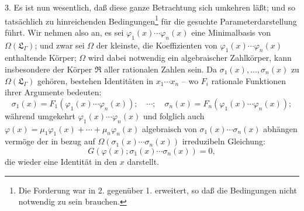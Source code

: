 \documentclass[11pt]{article}
\begin{document}
3. Es ist nun wesentlich, daß diese ganze Betrachtung sich umkehren läßt; und so tatsächlich zu hinreichenden Bedingungen\footnote{Die Forderung war in 2. gegenüber 1. erweitert, so daß die Bedingungen nicht notwendig zu sein brauchen.} für die gesuchte Parameterdarstellung führt. Wir nehmen also an, es sei $\varphi_1(x)\cdots\varphi_n(x)$ eine Minimalbasis von $\Omega(\mathfrak L_\Gamma)$; und zwar sei $\Omega$ der kleinste, die Koeffizienten von $\varphi_1(x)\cdots\varphi_n(x)$ enthaltende Körper; $\Omega$ wird dabei notwendig ein algebraischer Zahlkörper, kann insbesondere der Körper $\mathfrak R$ aller rationalen Zahlen sein. Da $\sigma_1(x),\ldots,\sigma_n(x)$ zu $\Omega(\mathfrak L_\Gamma)$ gehören, bestehen Identitäten in $x_1\cdots x_n$ -- wo $F_i$ rationale Funktionen ihrer Argumente bedeuten:
\begin{equation}
\sigma_1(x)=F_1(\varphi_1(x)\cdots\varphi_n(x));\quad \cdots;\quad
\sigma_n(x)=F_n(\varphi_1(x)\cdots\varphi_n(x));
\tag{5}
\end{equation}
während umgekehrt $\varphi_1(x)\cdots\varphi_n(x)$ und folglich auch $\varphi(x)=\mu_1\varphi_1(x)+\cdots+\mu_n\varphi_n(x)$ algebraisch von $\sigma_1(x)\cdots\sigma_n(x)$ abhängen vermöge der in bezug auf $\Omega(\sigma_1(x)\cdots\sigma_n(x))$ irreduzibeln Gleichung:
\begin{equation}
G(\varphi(x);\sigma_1(x)\cdots\sigma_n(x))=0,
\tag{6}
\end{equation}
die wieder eine Identität in den $x$ darstellt.
\end{document}
